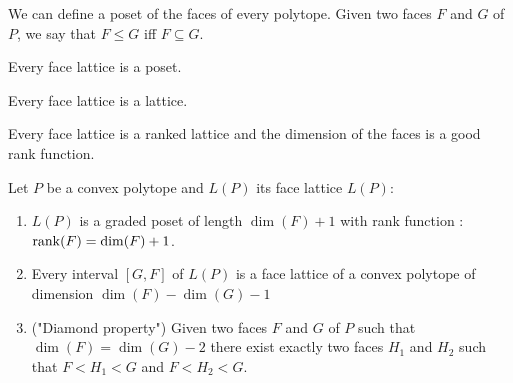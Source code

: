 \begin{definition}
  We can define a poset of the faces of every polytope. Given two faces $F$ and $G$ of $P$, we say that $F \le G$ iff $F \subseteq G$.
\end{definition}

\begin{proposition}
  Every face lattice is a poset.
\end{proposition}

\begin{proposition}
  Every face lattice is a lattice.
\end{proposition}

\begin{proposition}
  Every face lattice is a ranked lattice and the dimension of the faces is a good rank function.
\end{proposition}

\begin{proposition}
  Let $P$ be a convex polytope and $L(P)$ its face lattice $L(P)$:

  \begin{enumerate}
    \item $L(P)$ is a graded poset of length $\dim(F) + 1$ with rank function : $\operatorname{rank}(F) = \dim(F) + 1$.
    \item Every interval $[G,F]$ of $L(P)$ is a face lattice of a convex polytope of dimension $\dim(F) - \dim(G) - 1$
    \item ("Diamond property") Given two faces $F$ and $G$ of $P$ such that $\dim(F) = \dim(G) - 2$ there exist exactly two faces $H_1$ and $H_2$ such that $F < H_1 < G$ and $F < H_2 < G$.
  \end{enumerate}
\end{proposition}
